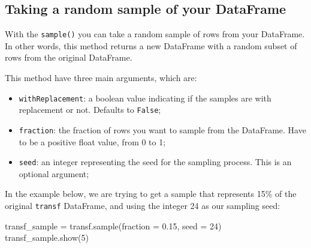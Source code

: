 \documentclass[
  11pt,
  letterpaper,
  DIV=11,
  numbers=noendperiod]{scrreprt}
\newenvironment{Shaded}{\begin{snugshade}}{\end{snugshade}}
\newcommand{\DecValTok}[1]{\textcolor[rgb]{0.68,0.00,0.00}{#1}}
\newcommand{\FloatTok}[1]{\textcolor[rgb]{0.68,0.00,0.00}{#1}}
\newcommand{\NormalTok}[1]{\textcolor[rgb]{0.00,0.23,0.31}{#1}}
\newcommand{\OperatorTok}[1]{\textcolor[rgb]{0.37,0.37,0.37}{#1}}
\providecommand{\tightlist}{%
  \setlength{\itemsep}{0pt}\setlength{\parskip}{0pt}}\usepackage{longtable,booktabs,array}
\begin{document}
\hypertarget{taking-a-random-sample-of-your-dataframe}{%
\subsection{Taking a random sample of your
DataFrame}\label{taking-a-random-sample-of-your-dataframe}}

With the \texttt{sample()} you can take a random sample of rows from
your DataFrame. In other words, this method returns a new DataFrame with
a random subset of rows from the original DataFrame.

This method have three main arguments, which are:

\begin{itemize}
\tightlist
\item
  \texttt{withReplacement}: a boolean value indicating if the samples
  are with replacement or not. Defaults to \texttt{False};
\item
  \texttt{fraction}: the fraction of rows you want to sample from the
  DataFrame. Have to be a positive float value, from 0 to 1;
\item
  \texttt{seed}: an integer representing the seed for the sampling
  process. This is an optional argument;
\end{itemize}

In the example below, we are trying to get a sample that represents 15\%
of the original \texttt{transf} DataFrame, and using the integer 24 as
our sampling seed:

\begin{Shaded}
\begin{Highlighting}[]
\NormalTok{transf\_sample }\OperatorTok{=}\NormalTok{ transf.sample(fraction }\OperatorTok{=} \FloatTok{0.15}\NormalTok{, seed }\OperatorTok{=} \DecValTok{24}\NormalTok{)}
\NormalTok{transf\_sample.show(}\DecValTok{5}\NormalTok{)}
\end{Highlighting}
\end{Shaded}
\end{document}

